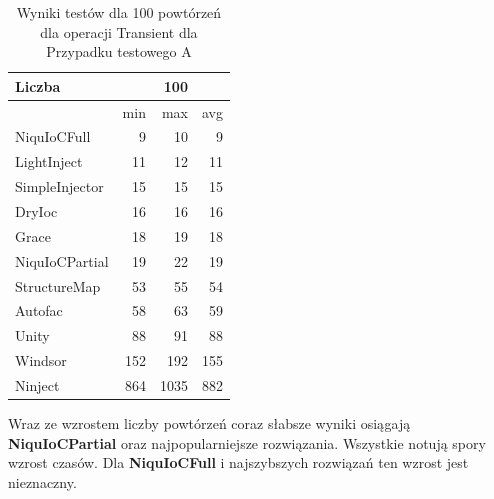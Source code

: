 \documentclass[12pt]{article}
\begin{document}
\begin{table}[H]
\captionsetup{belowskip=0pt,aboveskip=0pt}
\begin{center}
\begin{small}
	\begin{tabular}{ | l | r r r | }
    		\hline
Liczba & & 100 & \\ \hline
 & min & max & avg \\ \hline
NiquIoCFull & 9 & 10 & 9 \\ \hline
LightInject & 11 & 12 & 11 \\ \hline
SimpleInjector & 15 & 15 & 15 \\ \hline
DryIoc & 16 & 16 & 16 \\ \hline
Grace & 18 & 19 & 18 \\ \hline
NiquIoCPartial & 19 & 22 & 19 \\ \hline
StructureMap & 53 & 55 & 54 \\ \hline
Autofac & 58 & 63 & 59 \\ \hline
Unity & 88 & 91 & 88 \\ \hline
Windsor & 152 & 192 & 155 \\ \hline
Ninject & 864 & 1035 & 882 \\ \hline
  	\end{tabular}
\end{small}
\end{center}
\caption{Wyniki testów dla 100 powtórzeń dla operacji Transient dla Przypadku testowego A}
\label{TestCaseA_Transient100}
\end{table}
Wraz ze wzrostem liczby powtórzeń coraz słabsze wyniki osiągają \textbf{NiquIoCPartial} oraz najpopularniejsze rozwiązania. Wszystkie notują spory wzrost czasów. Dla \textbf{NiquIoCFull} i najszybszych rozwiązań ten wzrost jest nieznaczny.
\\ \\
\end{document}
